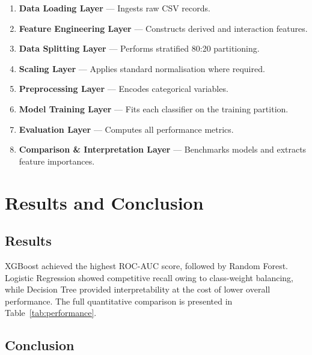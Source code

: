 \documentclass[12pt, a4paper]{report}
\begin{document}
\begin{enumerate}
  \item \textbf{Data Loading Layer} --- Ingests raw CSV records.
  \item \textbf{Feature Engineering Layer} --- Constructs derived and interaction
        features.
  \item \textbf{Data Splitting Layer} --- Performs stratified 80:20 partitioning.
  \item \textbf{Scaling Layer} --- Applies standard normalisation where required.
  \item \textbf{Preprocessing Layer} --- Encodes categorical variables.
  \item \textbf{Model Training Layer} --- Fits each classifier on the training
        partition.
  \item \textbf{Evaluation Layer} --- Computes all performance metrics.
  \item \textbf{Comparison \& Interpretation Layer} --- Benchmarks models and
        extracts feature importances.
\end{enumerate}

\chapter{Results and Conclusion}

\section{Results}

XGBoost achieved the highest ROC-AUC score, followed by Random Forest.
Logistic Regression showed competitive recall owing to class-weight balancing,
while Decision Tree provided interpretability at the cost of lower overall
performance. The full quantitative comparison is presented in
Table~\ref{tab:performance}.

\section{Conclusion}
\end{document}

